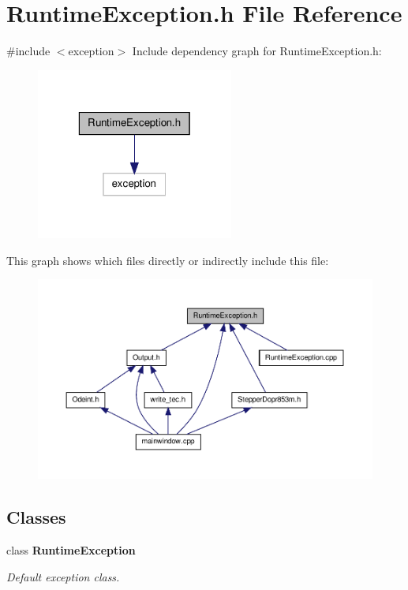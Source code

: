 \section{\-Runtime\-Exception.\-h \-File \-Reference}
\label{_runtime_exception_8h}
{\ttfamily \#include $<$exception$>$}\*
\-Include dependency graph for \-Runtime\-Exception.\-h\-:
\nopagebreak
\begin{figure}[H]
\begin{center}
\leavevmode
\includegraphics[width=184pt]{_runtime_exception_8h__incl}
\end{center}
\end{figure}
\-This graph shows which files directly or indirectly include this file\-:
\nopagebreak
\begin{figure}[H]
\begin{center}
\leavevmode
\includegraphics[width=350pt]{_runtime_exception_8h__dep__incl}
\end{center}
\end{figure}
\subsection*{\-Classes}
\begin{DoxyCompactItemize}
\item 
class {\bf \-Runtime\-Exception}
\begin{DoxyCompactList}\small\item\em \-Default exception class. \end{DoxyCompactList}\end{DoxyCompactItemize}

